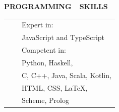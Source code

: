 \documentclass[a4paper,11pt,english]{article}
\newcommand{\LeftColumn}[0]{6.0cm}
\newcommand{\MarginColumn}[0]{28pt}
\newcommand{\ItemSkip}[0]{4pt}
\newcommand{\Bullet}[0]{\faCaretRight~~}
\newcommand{\Rubric}[1]{\colorbox{gray!20}{\parbox{\linewidth}{\centering\sffamily\bfseries{}#1}}}
\begin{document}
\begin{minipage}[t]{\LeftColumn}
\vspace{12pt}\Rubric{\faCode \quad PROGRAMMING~~SKILLS}\vspace{8pt}

\begin{tabularx}{\linewidth}{@{}l@{}l@{}}
\Bullet & Expert in: \\[0pt]
& \quad JavaScript and TypeScript \\[\ItemSkip]
\Bullet & Competent in: \\[0pt]
& \quad Python, Haskell, \\[0pt]
& \quad C, C++, Java, Scala, Kotlin, \\[0pt]
& \quad HTML, CSS, LaTeX, \\[0pt]
& \quad Scheme, Prolog \\[0pt]
\end{tabularx}

\end{minipage}
\hspace{\MarginColumn}
\end{document}

